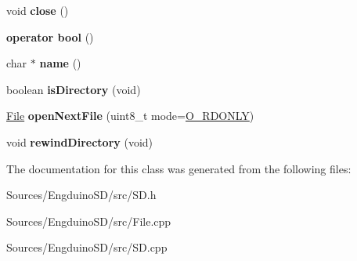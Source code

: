 \begin{DoxyCompactItemize}
\item 
\hypertarget{class_file_a83cbce54d6c3b8c2f417b51f6b3f488c}{}void {\bfseries close} ()\label{class_file_a83cbce54d6c3b8c2f417b51f6b3f488c}

\item 
\hypertarget{class_file_af171fbf441c899cf71d88b8b0b83d38b}{}{\bfseries operator bool} ()\label{class_file_af171fbf441c899cf71d88b8b0b83d38b}

\item 
\hypertarget{class_file_a7dc80cb96e6062652690a42b584f230e}{}char $\ast$ {\bfseries name} ()\label{class_file_a7dc80cb96e6062652690a42b584f230e}

\item 
\hypertarget{class_file_a532cb01e66c863f0a0c70bad3acbcdfe}{}boolean {\bfseries is\+Directory} (void)\label{class_file_a532cb01e66c863f0a0c70bad3acbcdfe}

\item 
\hypertarget{class_file_a19590302a57d1ba601a15fa44aeab643}{}\hyperlink{class_file}{File} {\bfseries open\+Next\+File} (uint8\+\_\+t mode=\hyperlink{_sd_fat_8h_ac13ca62d7e6f8f6d657d4607474652bf}{O\+\_\+\+R\+D\+O\+N\+L\+Y})\label{class_file_a19590302a57d1ba601a15fa44aeab643}

\item 
\hypertarget{class_file_a0fed2e25f4a38b19c57967d4bb6e3598}{}void {\bfseries rewind\+Directory} (void)\label{class_file_a0fed2e25f4a38b19c57967d4bb6e3598}

\end{DoxyCompactItemize}


The documentation for this class was generated from the following files\+:\begin{DoxyCompactItemize}
\item 
Sources/\+Engduino\+S\+D/src/S\+D.\+h\item 
Sources/\+Engduino\+S\+D/src/File.\+cpp\item 
Sources/\+Engduino\+S\+D/src/S\+D.\+cpp\end{DoxyCompactItemize}
